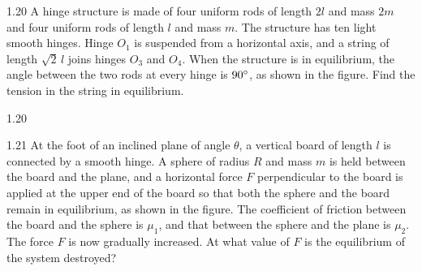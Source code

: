 \begin{problem}{1.20}
A hinge structure is made of four uniform rods of length $2l$ and mass $2m$ and four uniform rods of length $l$ and mass $m$. The structure has ten light smooth hinges. Hinge $O_1$ is suspended from a horizontal axis, and a string of length $\sqrt2\,l$ joins hinges $O_3$ and $O_4$. When the structure is in equilibrium, the angle between the two rods at every hinge is $90^{\circ}$, as shown in the figure. Find the tension in the string in equilibrium.
\end{problem}

\begin{figbox}{1.20}
\end{figbox}

\begin{problem}{1.21}
At the foot of an inclined plane of angle $\theta$, a vertical board of length $l$ is connected by a smooth hinge. A sphere of radius $R$ and mass $m$ is held between the board and the plane, and a horizontal force $F$ perpendicular to the board is applied at the upper end of the board so that both the sphere and the board remain in equilibrium, as shown in the figure. The coefficient of friction between the board and the sphere is $\mu_1$, and that between the sphere and the plane is $\mu_2$. The force $F$ is now gradually increased. At what value of $F$ is the equilibrium of the system destroyed?
\end{problem}

